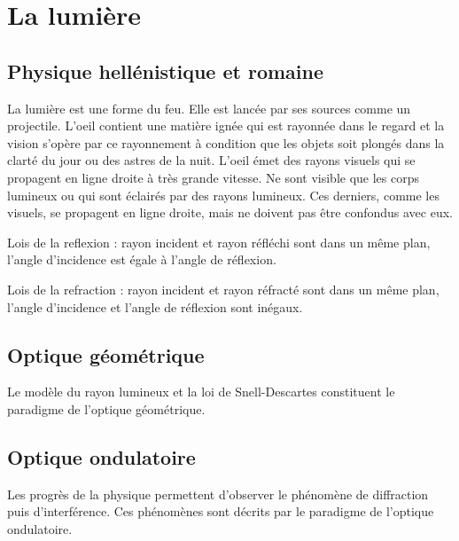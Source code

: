 
\section{La lumière}

\subsection{Physique hellénistique et romaine}

La lumière est une forme du feu. Elle est lancée par ses sources comme un projectile. L'oeil contient une matière ignée qui est rayonnée dans le regard et la vision s'opère par ce rayonnement à condition que les objets soit plongés dans la clarté du jour ou des astres de la nuit.
L'oeil émet des rayons visuels qui se propagent en ligne droite à très grande vitesse. Ne sont visible que les corps lumineux ou qui sont éclairés par des rayons lumineux. Ces derniers, comme les visuels, se propagent en ligne droite, mais ne doivent pas être confondus avec eux.

Lois de la reflexion : rayon incident et rayon réfléchi sont dans un même plan, l'angle d'incidence est égale à l'angle de réflexion.

Lois de la refraction : rayon incident et rayon réfracté sont dans un même plan, l'angle d'incidence et l'angle de réflexion sont inégaux. 


\subsection{Optique géométrique}
Le modèle du rayon lumineux et la loi de Snell-Descartes constituent le paradigme de l'optique géométrique.


\subsection{Optique ondulatoire}
Les progrès de la physique permettent d'observer le phénomène de diffraction puis d'interférence. Ces phénomènes sont décrits par le paradigme de l'optique ondulatoire.


